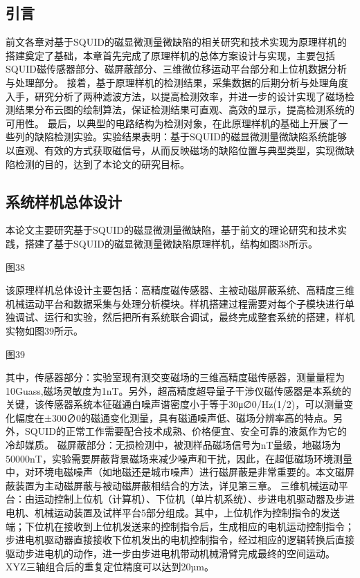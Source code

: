 \documentclass[a4paper,12pt，twoside]{ctexart}
\begin{document}
	\subsection{引言}
	前文各章对基于SQUID的磁显微测量微缺陷的相关研究和技术实现为原理样机的搭建奠定了基础，本章首先完成了原理样机的总体方案设计与实现，主要包括SQUID磁传感器部分、磁屏蔽部分、三维微位移运动平台部分和上位机数据分析与处理部分。
	接着，基于原理样机的检测结果，采集数据的后期分析与处理角度入手，研究分析了两种滤波方法，以提高检测效率，并进一步的设计实现了磁场检测结果分布云图的绘制算法，保证检测结果可直观、高效的显示，提高检测系统的可用性。
	最后，以典型的电路结构为检测对象，在此原理样机的基础上开展了一些列的缺陷检测实验。实验结果表明：基于SQUID的磁显微测量微缺陷系统能够以直观、有效的方式获取磁信号，从而反映磁场的缺陷位置与典型类型，实现微缺陷检测的目的，达到了本论文的研究目标。
	\subsection{系统样机总体设计}
	本论文主要研究基于SQUID的磁显微测量微缺陷，基于前文的理论研究和技术实践，搭建了基于SQUID的磁显微测量微缺陷原理样机，结构如图38所示。\par 
	图38\par 
	该原理样机总体设计主要包括：高精度磁传感器、主被动磁屏蔽系统、高精度三维机械运动平台和数据采集与处理分析模块。样机搭建过程需要对每个子模块进行单独调试、运行和实验，然后把所有系统联合调试，最终完成整套系统的搭建，样机实物如图39所示。\par 
	图39\par 
	其中，传感器部分：实验室现有测交变磁场的三维高精度磁传感器，测量量程为10Guass,磁场灵敏度为1nT。另外，超高精度超导量子干涉仪磁传感器是本系统的关键，该传感器系统本征磁通白噪声谱密度小于等于30μ∅0/Hz(1/2)，可以测量变化幅度在±300∅0的磁通变化测量，具有磁通噪声低、磁场分辨率高的特点。另外，SQUID的正常工作需要配合技术成熟、价格便宜、安全可靠的液氮作为它的冷却媒质。 
	磁屏蔽部分：无损检测中，被测样品磁场信号为nT量级，地磁场为50000nT，实验需要屏蔽背景磁场来减少噪声和干扰，因此，在超低磁场环境测量中，对环境电磁噪声（如地磁还是城市噪声）进行磁屏蔽是非常重要的。本文磁屏蔽装置为主动磁屏蔽与被动磁屏蔽相结合的方法，详见第三章。
	三维机械运动平台：由运动控制上位机（计算机）、下位机（单片机系统）、步进电机驱动器及步进电机、机械运动装置及试样平台5部分组成。其中，上位机作为控制指令的发送端；下位机在接收到上位机发送来的控制指令后，生成相应的电机运动控制指令；步进电机驱动器直接接收下位机发出的电机控制指令，经过相应的逻辑转换后直接驱动步进电机的动作，进一步由步进电机带动机械滑臂完成最终的空间运动。XYZ三轴组合后的重复定位精度可以达到20µm。
	
\end{document}
